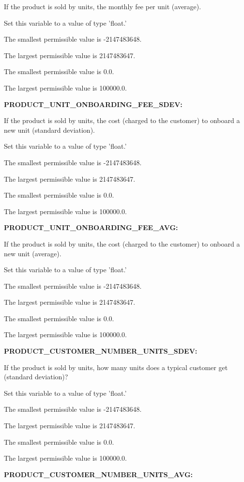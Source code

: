 If the product is sold by units, the monthly fee per unit (average).

Set this variable to a value of type 'float.'

The smallest permissible value is -2147483648.

The largest permissible value is 2147483647.

The smallest permissible value is 0.0.

The largest permissible value is 100000.0.


\textbf{PRODUCT\_UNIT\_ONBOARDING\_FEE\_SDEV:}


If the product is sold by units, the cost (charged to the customer) to onboard a new unit (standard deviation).

Set this variable to a value of type 'float.'

The smallest permissible value is -2147483648.

The largest permissible value is 2147483647.

The smallest permissible value is 0.0.

The largest permissible value is 100000.0.


\textbf{PRODUCT\_UNIT\_ONBOARDING\_FEE\_AVG:}


If the product is sold by units, the cost (charged to the customer) to onboard a new unit (average).

Set this variable to a value of type 'float.'

The smallest permissible value is -2147483648.

The largest permissible value is 2147483647.

The smallest permissible value is 0.0.

The largest permissible value is 100000.0.


\textbf{PRODUCT\_CUSTOMER\_NUMBER\_UNITS\_SDEV:}


If the product is sold by units, how many units does a typical customer get (standard deviation)?

Set this variable to a value of type 'float.'

The smallest permissible value is -2147483648.

The largest permissible value is 2147483647.

The smallest permissible value is 0.0.

The largest permissible value is 100000.0.


\textbf{PRODUCT\_CUSTOMER\_NUMBER\_UNITS\_AVG:}


